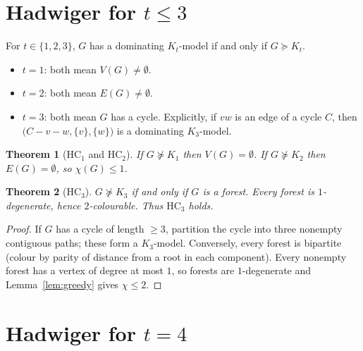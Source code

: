 \documentclass[11pt]{article}
\newtheorem{theorem}{Theorem}[section]
\theoremstyle{definition}
\begin{document}
\section{Hadwiger for \(t\le 3\)}

\begin{observation}
\label{obs:dom-small}
For \(t\in\{1,2,3\}\), \(G\) has a dominating \(K_t\)-model if and only if
\(G\succcurlyeq K_t\).
\begin{itemize}
\item \(t=1\): both mean \(V(G)\neq\emptyset\).
\item \(t=2\): both mean \(E(G)\neq\emptyset\).
\item \(t=3\): both mean \(G\) has a cycle. Explicitly, if \(vw\) is an edge of a
cycle \(C\), then \(\bigl(C-v-w,\{v\},\{w\}\bigr)\) is a dominating \(K_3\)-model.
\end{itemize}
\end{observation}

\begin{theorem}[\(\mathrm{HC}_1\) and \(\mathrm{HC}_2\)]\label{thm:hc12}
If \(G\not\succcurlyeq K_1\) then \(V(G)=\emptyset\). If \(G\not\succcurlyeq K_2\)
then \(E(G)=\emptyset\), so \(\chi(G)\le 1\).
\end{theorem}

\begin{theorem}[\(\mathrm{HC}_3\)]\label{thm:hc3}
\(G\not\succcurlyeq K_3\) if and only if \(G\) is a forest. Every forest is
\(1\)-degenerate, hence \(2\)-colourable. Thus \(\mathrm{HC}_3\) holds.
\end{theorem}

\begin{proof}
If \(G\) has a cycle of length \(\ge 3\), partition the cycle into three nonempty
contiguous paths; these form a \(K_3\)-model. Conversely, every forest is
bipartite (colour by parity of distance from a root in each component). Every
nonempty forest has a vertex of degree at most \(1\), so forests are
\(1\)-degenerate and Lemma~\ref{lem:greedy} gives \(\chi\le 2\).
\end{proof}

\section{Hadwiger for \(t=4\)}
\end{document}
